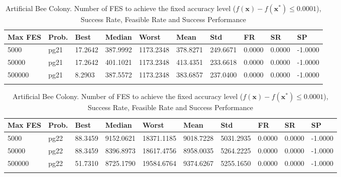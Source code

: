 \documentclass[10pt, a4paper]{book}
\begin{document}
\begin{center}
\begin{longtable}{l l l l l l l l l l}
\textbf{Max FES} & \textbf{Prob.} & \textbf{Best} & \textbf{Median} & \textbf{Worst} & \textbf{Mean} & \textbf{Std} & \textbf{FR} & \textbf{SR} & \textbf{SP} \\
\hline
5000 & pg21 & 17.2642 & 387.9992 & 1173.2348 & 378.8271 & 249.6671 & 0.0000 & 0.0000 & -1.0000 \\
50000 & pg21 & 17.2642 & 401.1021 & 1173.2348 & 413.4351 & 233.6618 & 0.0000 & 0.0000 & -1.0000 \\
500000 & pg21 & 8.2903 & 387.5572 & 1173.2348 & 383.6857 & 237.0400 & 0.0000 & 0.0000 & -1.0000 \\

\caption{ Artificial Bee Colony. Number of FES to achieve the fixed accuracy level ($f(\mathbf{x}) - f(\mathbf{x}^{*}) \leq 0.0001$), Success Rate, Feasible Rate and Success Performance }
\end{longtable}
\end{center}

\begin{center}
\begin{longtable}{l l l l l l l l l l}
\textbf{Max FES} & \textbf{Prob.} & \textbf{Best} & \textbf{Median} & \textbf{Worst} & \textbf{Mean} & \textbf{Std} & \textbf{FR} & \textbf{SR} & \textbf{SP} \\
\hline
5000 & pg22 & 88.3459 & 9152.0621 & 18371.1185 & 9018.7228 & 5031.2935 & 0.0000 & 0.0000 & -1.0000 \\
50000 & pg22 & 88.3459 & 8396.8973 & 18617.4756 & 8958.0035 & 5264.2225 & 0.0000 & 0.0000 & -1.0000 \\
500000 & pg22 & 51.7310 & 8725.1790 & 19584.6764 & 9374.6267 & 5255.1650 & 0.0000 & 0.0000 & -1.0000 \\

\caption{ Artificial Bee Colony. Number of FES to achieve the fixed accuracy level ($f(\mathbf{x}) - f(\mathbf{x}^{*}) \leq 0.0001$), Success Rate, Feasible Rate and Success Performance }
\end{longtable}
\end{center}
\end{document}
